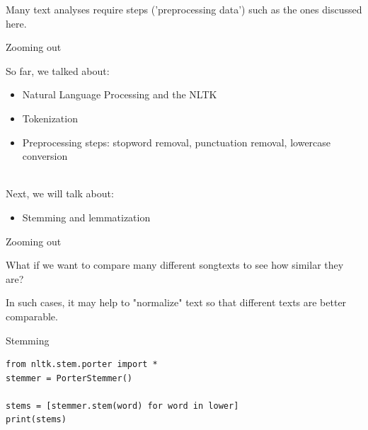 \documentclass[handout]{beamer}
\begin{document}
\begin{frame}

Many text analyses require steps ('preprocessing data') such as the ones discussed here.

\end{frame}

\begin{frame}{Zooming out} 
	
So far, we talked about:
\begin{itemize}
	\item Natural Language Processing and the NLTK
	\item Tokenization 
	\item Preprocessing steps: stopword removal, punctuation removal, lowercase conversion \\\
\end{itemize}
	
Next, we will talk about:
	\begin{itemize}
		\item Stemming and lemmatization
	\end{itemize}
	
\end{frame}


\begin{frame}{Zooming out} 
	
What if we want to compare many different songtexts to see how similar they are?

In such cases, it may help to "normalize" text so that different texts are better comparable.

\end{frame}


\begin{frame}[fragile]{Stemming }

\begin{lstlisting}
from nltk.stem.porter import *
stemmer = PorterStemmer()

stems = [stemmer.stem(word) for word in lower]
print(stems)
\end{lstlisting}

\begin{lstlistingoutput}
\end{lstlistingoutput}


\end{frame}
\end{document}
